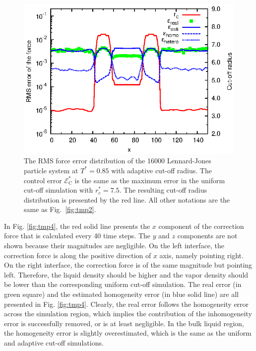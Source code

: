 \documentclass[aps,pre,preprint]{revtex4}
\begin{document}
\begin{figure}
  \centering
  \includegraphics[]{fig/t0.85-n16000-adapt-e0.0045-extend/rcut.and.error.eps}
  \caption{ The RMS force error distribution of the 16000
    Lennard-Jones particle system at $T^\ast=0.85$ with adaptive
    cut-off radius. The control error $\mathcal E^\ast_{\textrm{C}}$
    is the same as the maximum error in the uniform cut-off simulation
    with $r_c^\ast=7.5$.  The resulting cut-off radius distribution is
    presented by the red line. All other notations are the same as
    Fig.~\ref{fig:tmp2}.}
  \label{fig:tmp3}
\end{figure}


In Fig. \ref{fig:tmp4}, the red solid line presents the $x$ component
of the 
correction force that is calculated every 40 time steps. The $y$ and
$z$ components are not shown because their magnitudes are negligible.
On the left interface, the correction force is along the positive
direction of $x$ axis, namely pointing right.  On the right interface,
the correction force is of the same magnitude but pointing
left. Therefore, the liquid density should be higher and the vapor
density should be lower than the corresponding uniform cut-off
simulation.  The real error (in green square) and the estimated
homogeneity error (in blue solid line) are all presented in
Fig. \ref{fig:tmp4}.  Clearly, the real error follows the homogeneity
error across the simulation region, which implies the contribution of
the inhomogeneity error is successfully removed, or is at least
negligible. In the bulk liquid region, the homogeneity error is
slightly overestimated, which is the same as the uniform and adaptive
cut-off simulations.
\end{document}
